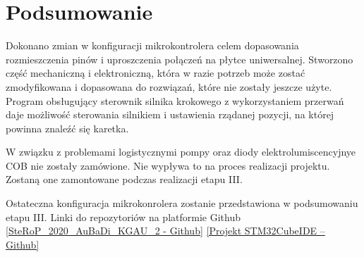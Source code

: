 \documentclass[10pt, a4paper]{article}
\begin{document}
\section{Podsumowanie}

Dokonano zmian w konfiguracji mikrokontrolera celem dopasowania rozmieszczenia pinów i uproszczenia połączeń na płytce uniwersalnej. Stworzono część mechaniczną i elektroniczną, która w razie potrzeb może zostać zmodyfikowana i dopasowana do rozwiązań, które nie zostały jeszcze użyte. Program obsługujący sterownik silnika krokowego z wykorzystaniem przerwań daje możliwość sterowania silnikiem i ustawienia rządanej pozycji, na której powinna znaleźć się karetka.

W związku z problemami logistycznymi pompy oraz diody elektrolumiscencyjnye COB nie zostały zamówione. Nie wypływa to na proces realizacji projektu. Zostaną one zamontowane podczas realizacji etapu III. 

Ostateczna konfiguracja mikrokonrolera zostanie przedstawiona w podsumowaniu etapu III. 
\newline
\newline
Linki do repozytoriów na platformie Github
\newline
\href{https://github.com/kewingaluszka/SteRoP_2020_AuBaDi_KGAU_2}{[SteRoP\_2020\_AuBaDi\_KGAU\_2 - Github]}
\newline
\href{https://github.com/kewingaluszka/STM32_AuBaDi}{[Projekt STM32CubeIDE -- Github]}
\end{document}
